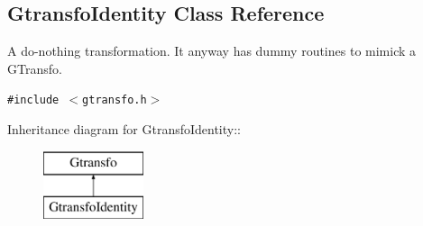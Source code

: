 \subsection{Gtransfo\-Identity  Class Reference}
\label{class_gtransfoidentity}
A do-nothing transformation. It anyway has dummy routines to mimick a GTransfo. 


{\tt \#include $<$gtransfo.h$>$}

Inheritance diagram for Gtransfo\-Identity::\begin{figure}[H]
\begin{center}
\leavevmode
\includegraphics[height=2cm]{class_gtransfoidentity}
\end{center}
\end{figure}

